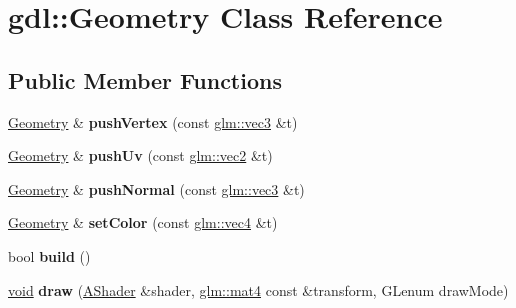 \hypertarget{classgdl_1_1_geometry}{}\section{gdl\+:\+:Geometry Class Reference}
\label{classgdl_1_1_geometry}
\subsection*{Public Member Functions}
\begin{DoxyCompactItemize}
\item 
\hypertarget{classgdl_1_1_geometry_a541c2b0d02cd3cbee44dbb312bd682f8}{}\hyperlink{classgdl_1_1_geometry}{Geometry} \& {\bfseries push\+Vertex} (const \hyperlink{group__core__types_gad45787527c6ff2bd6680867204eb0354}{glm\+::vec3} \&t)\label{classgdl_1_1_geometry_a541c2b0d02cd3cbee44dbb312bd682f8}

\item 
\hypertarget{classgdl_1_1_geometry_aa441f58a331324338c4001012d550690}{}\hyperlink{classgdl_1_1_geometry}{Geometry} \& {\bfseries push\+Uv} (const \hyperlink{group__core__types_ga66d091b759687504ab01365fbd33a1dd}{glm\+::vec2} \&t)\label{classgdl_1_1_geometry_aa441f58a331324338c4001012d550690}

\item 
\hypertarget{classgdl_1_1_geometry_aa727f26ba81f6fe814f9a47f8282ae33}{}\hyperlink{classgdl_1_1_geometry}{Geometry} \& {\bfseries push\+Normal} (const \hyperlink{group__core__types_gad45787527c6ff2bd6680867204eb0354}{glm\+::vec3} \&t)\label{classgdl_1_1_geometry_aa727f26ba81f6fe814f9a47f8282ae33}

\item 
\hypertarget{classgdl_1_1_geometry_a10c8f23c09c2c118038e5087ea767c07}{}\hyperlink{classgdl_1_1_geometry}{Geometry} \& {\bfseries set\+Color} (const \hyperlink{group__core__types_gae9c89157f980f7247cdee8bf55787035}{glm\+::vec4} \&t)\label{classgdl_1_1_geometry_a10c8f23c09c2c118038e5087ea767c07}

\item 
\hypertarget{classgdl_1_1_geometry_a6e8f3c283012d41ea72d4f091b82652d}{}bool {\bfseries build} ()\label{classgdl_1_1_geometry_a6e8f3c283012d41ea72d4f091b82652d}

\item 
\hypertarget{classgdl_1_1_geometry_a1345bc83eed3ae62fce3158e459e6973}{}\hyperlink{_s_d_l__audio_8h_a52835ae37c4bb905b903cbaf5d04b05f}{void} {\bfseries draw} (\hyperlink{classgdl_1_1_a_shader}{A\+Shader} \&shader, \hyperlink{group__core__types_ga7dcd2365c2e368e6af5b7adeb6a9c8df}{glm\+::mat4} const \&transform, G\+Lenum draw\+Mode)\label{classgdl_1_1_geometry_a1345bc83eed3ae62fce3158e459e6973}

\end{DoxyCompactItemize}
